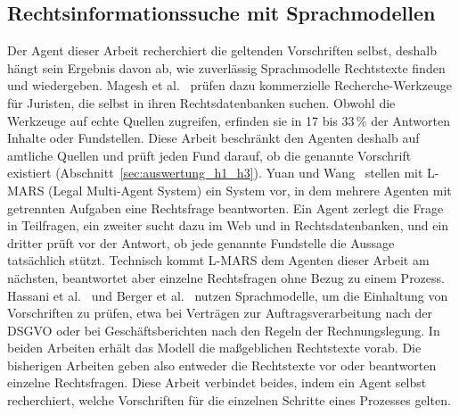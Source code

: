 \subsection{Rechtsinformationssuche mit Sprachmodellen}
Der Agent dieser Arbeit recherchiert die geltenden Vorschriften selbst, deshalb hängt sein Ergebnis davon ab, wie zuverlässig Sprachmodelle Rechtstexte finden und wiedergeben.
Magesh et al.~\cite{magesh2025} prüfen dazu kommerzielle Recherche-Werkzeuge für Juristen, die selbst in ihren Rechtsdatenbanken suchen.
Obwohl die Werkzeuge auf echte Quellen zugreifen, erfinden sie in 17 bis 33\,\% der Antworten Inhalte oder Fundstellen.
Diese Arbeit beschränkt den Agenten deshalb auf amtliche Quellen und prüft jeden Fund darauf, ob die genannte Vorschrift existiert (Abschnitt~\ref{sec:auswertung_h1_h3}).
Yuan und Wang~\cite{yuan2025} stellen mit L-MARS (Legal Multi-Agent System) ein System vor, in dem mehrere Agenten mit getrennten Aufgaben eine Rechtsfrage beantworten.
Ein Agent zerlegt die Frage in Teilfragen, ein zweiter sucht dazu im Web und in Rechtsdatenbanken, und ein dritter prüft vor der Antwort, ob jede genannte Fundstelle die Aussage tatsächlich stützt.
Technisch kommt L-MARS dem Agenten dieser Arbeit am nächsten, beantwortet aber einzelne Rechtsfragen ohne Bezug zu einem Prozess.
Hassani et al.~\cite{hassani2024} und Berger et al.~\cite{berger2025} nutzen Sprachmodelle, um die Einhaltung von Vorschriften zu prüfen, etwa bei Verträgen zur Auftragsverarbeitung nach der DSGVO oder bei Geschäftsberichten nach den Regeln der Rechnungslegung.
In beiden Arbeiten erhält das Modell die maßgeblichen Rechtstexte vorab.
Die bisherigen Arbeiten geben also entweder die Rechtstexte vor oder beantworten einzelne Rechtsfragen.
Diese Arbeit verbindet beides, indem ein Agent selbst recherchiert, welche Vorschriften für die einzelnen Schritte eines Prozesses gelten.

